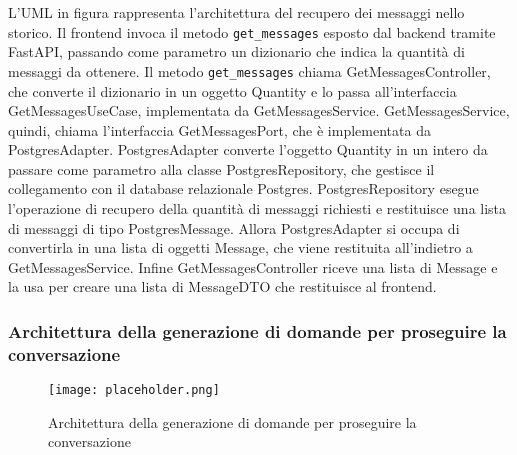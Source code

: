 L'UML in figura rappresenta l'architettura del recupero dei messaggi nello storico.
Il frontend invoca il metodo \texttt{get\_messages} esposto dal backend tramite FastAPI, passando come parametro un dizionario che indica la quantità di messaggi da ottenere.
Il metodo \texttt{get\_messages} chiama GetMessagesController, che converte il dizionario in un oggetto Quantity e lo passa all'interfaccia GetMessagesUseCase, implementata da GetMessagesService.
GetMessagesService, quindi, chiama l'interfaccia GetMessagesPort, che è implementata da PostgresAdapter.
PostgresAdapter converte l'oggetto Quantity in un intero da passare come parametro alla classe PostgresRepository, che gestisce il collegamento con il database relazionale Postgres. 
PostgresRepository esegue l’operazione di recupero della quantità di messaggi richiesti e restituisce una lista di messaggi di tipo PostgresMessage.
Allora PostgresAdapter si occupa di convertirla in una lista di oggetti Message, che viene restituita all'indietro a GetMessagesService.
Infine GetMessagesController riceve una lista di Message e la usa per creare una lista di MessageDTO che restituisce al frontend.

\newpage


\subsubsection{Architettura della generazione di domande per proseguire la conversazione}
\label{sec:architettura_generazione_domande_conversazione}

\begin{figure}[h]
    \centering
    \texttt{[image: placeholder.png]}
    \caption{Architettura della generazione di domande per proseguire la conversazione}
\end{figure}

